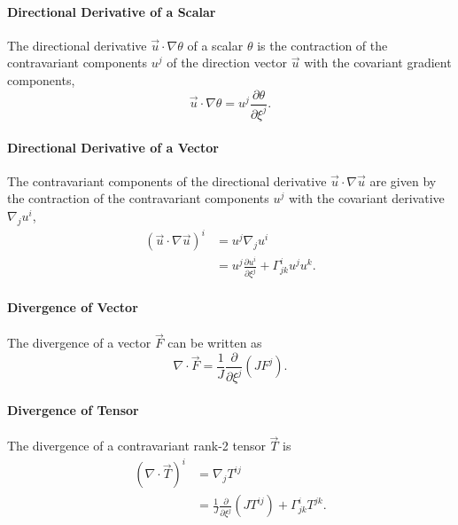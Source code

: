 \documentclass{report}
\begin{document}
\paragraph{Directional Derivative of a Scalar} The  directional derivative $\vec{u} \cdot \nabla \theta$ of a scalar $\theta$ is the contraction of the contravariant components $u^j$ of the direction vector $\vec{u}$ with the covariant gradient components,
\[
\vec{u} \cdot \nabla \theta = u^j \frac{\partial\theta}{\partial \xi^j}.
\]

\paragraph{Directional Derivative of a Vector} The contravariant components of the directional derivative $\vec{u} \cdot \nabla \vec{u}$ are given by the contraction of the contravariant components $u^j$ with the covariant derivative $\nabla_j u^i$,
\begin{align*}
(\vec{u} \cdot \nabla \vec{u})^i & = u^j \nabla_j u^i \\
& = u^j \frac{\partial u^i}{\partial \xi^j} + \Gamma^i_{jk} u^j u^k.
\end{align*}

\paragraph{Divergence of Vector} The divergence of a vector $\vec{F}$ can be written as 
\begin{equation}\label{eq:div-of-vec}
    \nabla \cdot \vec{F} = \frac{1}{J} \frac{\partial}{\partial \xi^j} \left(J {F}^j \right).
\end{equation}

\paragraph{Divergence of Tensor} The divergence of a contravariant rank-2 tensor $\vec{T}$ is  
\begin{align}\label{e:tensor_div}
(\nabla \cdot \vec{T})^i & = \nabla_j T^{ij} \\ 
&= \frac{1}{J} \frac{\partial}{\partial \xi^j} \left(J {T}^{ij} \right) + \Gamma^i_{jk} T^{jk}.
\end{align}
\end{document}
